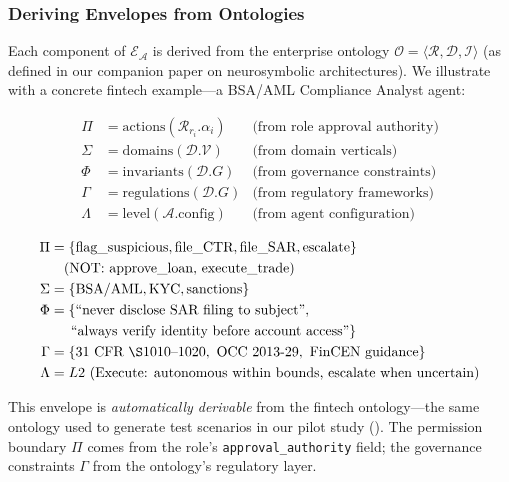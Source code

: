 \documentclass[11pt,a4paper]{article}
\newcommand{\agent}{\mathcal{A}}
\newcommand{\env}{\mathcal{E}}
\newcommand{\onto}{\mathcal{O}}
\begin{document}
\subsubsection{Deriving Envelopes from Ontologies}

Each component of $\env_\agent$ is derived from the enterprise
ontology $\onto = \langle \mathcal{R}, \mathcal{D}, \mathcal{I} \rangle$
(as defined in our companion paper on neurosymbolic architectures).
We illustrate with a concrete fintech example---a BSA/AML Compliance
Analyst agent:

\begin{align}
  \Pi &= \text{actions}(\mathcal{R}_{r_i}.\alpha_i)
    & \text{(from role approval authority)} \\
  \Sigma &= \text{domains}(\mathcal{D}.\mathcal{V})
    & \text{(from domain verticals)} \\
  \Phi &= \text{invariants}(\mathcal{D}.G)
    & \text{(from governance constraints)} \\
  \Gamma &= \text{regulations}(\mathcal{D}.G)
    & \text{(from regulatory frameworks)} \\
  \Lambda &= \text{level}(\agent.\text{config})
    & \text{(from agent configuration)}
\end{align}

\begin{tcolorbox}[title=Example: Fintech Compliance Analyst Envelope,
  colback=blue!5, colframe=blue!40]
\small
\begin{align*}
  \Pi &= \{\text{flag\_suspicious}, \text{file\_CTR}, \text{file\_SAR},
    \text{escalate}\} \\
    &\quad \text{(NOT: approve\_loan, execute\_trade)} \\
  \Sigma &= \{\text{BSA/AML}, \text{KYC}, \text{sanctions}\} \\
  \Phi &= \{\text{``never disclose SAR filing to subject''},\\
    &\quad\phantom{\{} \text{``always verify identity before account access''}\} \\
  \Gamma &= \{31\text{ CFR }\S1010\text{--}1020, \text{ OCC 2013-29},
    \text{ FinCEN guidance}\} \\
  \Lambda &= L2 \text{ (Execute: autonomous within bounds, escalate
    when uncertain)}
\end{align*}
\end{tcolorbox}

\noindent This envelope is \emph{automatically derivable} from the
fintech ontology---the same ontology used to generate test scenarios
in our pilot study (). The permission boundary $\Pi$
comes from the role's \texttt{approval\_authority} field; the
governance constraints $\Gamma$ from the ontology's regulatory layer.
\end{document}
